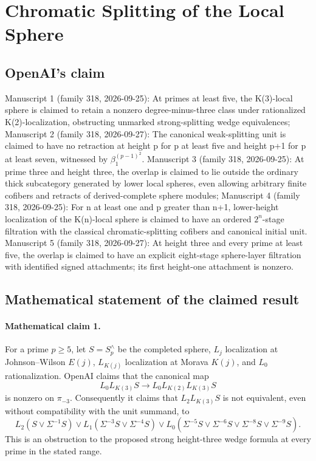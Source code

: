 \documentclass[11pt]{article}
\begin{document}
\section*{Chromatic Splitting of the Local Sphere}

\subsection{OpenAI's claim}
Manuscript 1 (family 318, 2026-09-25): At primes at least five, the K(3)-local sphere is claimed to retain a nonzero degree-minus-three class under rationalized K(2)-localization, obstructing unmarked strong-splitting wedge equivalences; Manuscript 2 (family 318, 2026-09-27): The canonical weak-splitting unit is claimed to have no retraction at height p for p at least five and height p+1 for p at least seven, witnessed by \(\beta_1^{(p-1)^2}\). Manuscript 3 (family 318, 2026-09-25): At prime three and height three, the overlap is claimed to lie outside the ordinary thick subcategory generated by lower local spheres, even allowing arbitrary finite cofibers and retracts of derived-complete sphere modules; Manuscript 4 (family 318, 2026-09-25): For n at least one and p greater than n+1, lower-height localization of the K(n)-local sphere is claimed to have an ordered \(2^n\)-stage filtration with the classical chromatic-splitting cofibers and canonical initial unit. Manuscript 5 (family 318, 2026-09-27): At height three and every prime at least five, the overlap is claimed to have an explicit eight-stage sphere-layer filtration with identified signed attachments; its first height-one attachment is nonzero.

\subsection{Mathematical statement of the claimed result}
\paragraph{Mathematical claim 1.} For a prime $p\ge5$, let $S=S_p^\wedge$ be the completed sphere, $L_j$ localization at Johnson--Wilson $E(j)$, $L_{K(j)}$ localization at Morava $K(j)$, and $L_0$ rationalization. OpenAI claims that the canonical map
\[
L_0L_{K(3)}S\longrightarrow L_0L_{K(2)}L_{K(3)}S
\]
is nonzero on $\pi_{-3}$. Consequently it claims that $L_2L_{K(3)}S$ is not equivalent, even without compatibility with the unit summand, to
\[
L_2(S\vee\Sigma^{-1}S)\vee L_1(\Sigma^{-3}S\vee\Sigma^{-4}S)
\vee L_0(\Sigma^{-5}S\vee\Sigma^{-6}S\vee\Sigma^{-8}S\vee\Sigma^{-9}S).
\]
This is an obstruction to the proposed strong height-three wedge formula at every prime in the stated range.
\end{document}
